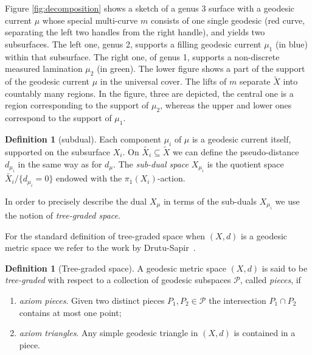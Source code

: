 \documentclass[12pt,article]{amsart}
\numberwithin{equation}{section}
\numberwithin{figure}{section}
\theoremstyle{definition}
\newtheorem{definition}[equation]{Definition}
\theoremstyle{plain}
\newcommand*{\wt}[1]{\widetilde{#1}}
\begin{document}
Figure \ref{fig:decomposition} shows a sketch of a genus $3$ surface with a geodesic current $\mu$ whose special multi-curve $m$ consists of one single geodesic (red curve, separating the left two handles from the right handle), and yields two subsurfaces. The left one, genus 2, supports a filling geodesic current $\mu_1$ (in blue) within that subsurface. The right one, of genus 1, supports a non-discrete measured lamination $\mu_2$ (in green). The lower figure shows a part of the support of the geodesic current $\mu$ in the universal cover. The lifts of $m$ separate $\wt{X}$ into countably many regions. In the figure, three are depicted, the central one is a region corresponding to the support of $\mu_2$, whereas the upper and lower ones correspond to the support of $\mu_1$.

\begin{definition}[subdual]
Each component $\mu_i$ of $\mu$ is a geodesic current itself, supported on the subsurface $X_i$. On $\wt{X_i} \subseteq \wt{X}$ we can define the pseudo-distance $d_{\mu_i}$ in the same way as for $d_\mu$. The \emph{sub-dual space} $X_{\mu_i}$ is the quotient space $\wt{X_i} / {\{d_{\mu_i} = 0 \}}$ endowed with the $\pi_1 (X_i)$-action.
\label{def:subdual}
\end{definition}

In order to precisely describe the dual $X_\mu$ in terms of the sub-duals $X_{\mu_i}$ we use the notion of \emph{tree-graded space}. 

 For the standard definition of tree-graded space when $(X,d)$ is a geodesic metric space we refer to the work by Drutu-Sapir~\cite{DS05:Treegraded}.


\begin{definition}[Tree-graded space]
A geodesic metric space $(X,d)$ is said to be \emph{tree-graded} with respect to a collection of geodesic subspaces $\mathcal{P}$, called \emph{pieces}, if 
\begin{enumerate}
    \item \emph{axiom pieces}. Given two distinct pieces $P_1 , P_2 \in \mathcal{P}$ the intersection $P_1 \cap P_2$ contains at most one point;
    \item \emph{axiom triangles}. Any simple geodesic triangle in $(X,d)$ is contained in a piece. 
\end{enumerate}
\label{def:treegraded_ds}
\end{definition}
\end{document}
